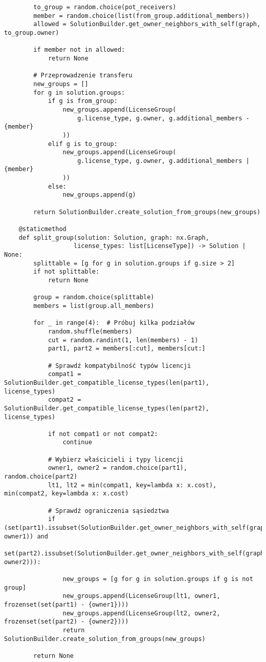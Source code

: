 {\begin{verbatim}
        to_group = random.choice(pot_receivers)
        member = random.choice(list(from_group.additional_members))
        allowed = SolutionBuilder.get_owner_neighbors_with_self(graph, to_group.owner)

        if member not in allowed:
            return None

        # Przeprowadzenie transferu
        new_groups = []
        for g in solution.groups:
            if g is from_group:
                new_groups.append(LicenseGroup(
                    g.license_type, g.owner, g.additional_members - {member}
                ))
            elif g is to_group:
                new_groups.append(LicenseGroup(
                    g.license_type, g.owner, g.additional_members | {member}
                ))
            else:
                new_groups.append(g)

        return SolutionBuilder.create_solution_from_groups(new_groups)

    @staticmethod
    def split_group(solution: Solution, graph: nx.Graph,
                   license_types: list[LicenseType]) -> Solution | None:
        splittable = [g for g in solution.groups if g.size > 2]
        if not splittable:
            return None

        group = random.choice(splittable)
        members = list(group.all_members)

        for _ in range(4):  # Próbuj kilka podziałów
            random.shuffle(members)
            cut = random.randint(1, len(members) - 1)
            part1, part2 = members[:cut], members[cut:]

            # Sprawdź kompatybilność typów licencji
            compat1 = SolutionBuilder.get_compatible_license_types(len(part1), license_types)
            compat2 = SolutionBuilder.get_compatible_license_types(len(part2), license_types)

            if not compat1 or not compat2:
                continue

            # Wybierz właścicieli i typy licencji
            owner1, owner2 = random.choice(part1), random.choice(part2)
            lt1, lt2 = min(compat1, key=lambda x: x.cost), min(compat2, key=lambda x: x.cost)

            # Sprawdź ograniczenia sąsiedztwa
            if (set(part1).issubset(SolutionBuilder.get_owner_neighbors_with_self(graph, owner1)) and
                set(part2).issubset(SolutionBuilder.get_owner_neighbors_with_self(graph, owner2))):

                new_groups = [g for g in solution.groups if g is not group]
                new_groups.append(LicenseGroup(lt1, owner1, frozenset(set(part1) - {owner1})))
                new_groups.append(LicenseGroup(lt2, owner2, frozenset(set(part2) - {owner2})))
                return SolutionBuilder.create_solution_from_groups(new_groups)

        return None
\end{verbatim}
}

